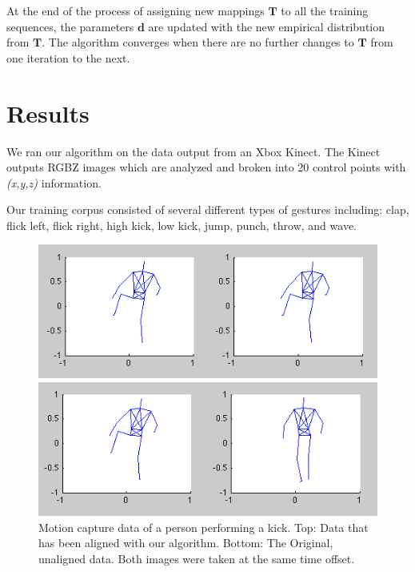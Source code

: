 \documentclass{article}
\begin{document}
At the end of the process of assigning new mappings $\mathbf{T}$ to all the training
sequences, the parameters $\mathbf{d}$ are updated with the new empirical
distribution from $\mathbf{T}$. The algorithm converges when there are no further
changes to $\mathbf{T}$ from one iteration to the next.

\section{Results}

We ran our algorithm on the data output from an Xbox Kinect. The Kinect outputs
RGBZ images which are analyzed and broken into 20 control points with
\emph{(x,y,z)} information.

Our training corpus consisted of several different types of gestures including:
clap, flick left, flick right, high kick, low kick, jump, punch, throw, and
wave. 



\begin{figure}
\begin{centering}

\begin{centering}
\includegraphics[width=\columnwidth]{figures/kick_aligned.png}	
\end{centering}
\begin{centering}
\includegraphics[width=\columnwidth]{figures/kick_unaligned.png}	
\end{centering}

\vspace{-0.2in}

\caption{Motion capture data of a person performing a kick. Top:
 Data that has
been aligned with our algorithm. Bottom: The Original, unaligned data. Both
images were taken at the same time offset. \label{figure:kick}}

\end{centering}
\end{figure}
\end{document}

